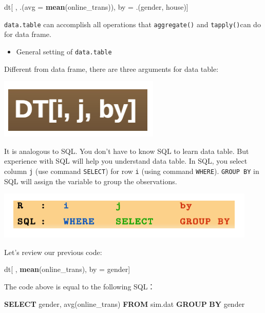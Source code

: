 \documentclass[12pt,]{krantz}
\makeatletter
\newenvironment{Shaded}{\begin{snugshade}}{\end{snugshade}}
\newcommand{\KeywordTok}[1]{\textcolor[rgb]{0.27,0.27,0.27}{\textbf{#1}}}
\newcommand{\DataTypeTok}[1]{\textcolor[rgb]{0.27,0.27,0.27}{#1}}
\newcommand{\StringTok}[1]{\textcolor[rgb]{0.5,0.5,0.5}{#1}}
\newcommand{\FunctionTok}[1]{\textcolor[rgb]{0,0,0}{#1}}
\newcommand{\NormalTok}[1]{#1}
\providecommand{\tightlist}{%
  \setlength{\itemsep}{0pt}\setlength{\parskip}{0pt}}
\newenvironment{kframe}{%
\medskip{}
\setlength{\fboxsep}{.8em}
 \def\at@end@of@kframe{}%
 \ifinner\ifhmode%
  \def\at@end@of@kframe{\end{minipage}}%
  \begin{minipage}{\columnwidth}%
 \fi\fi%
 \def\FrameCommand##1{\hskip\@totalleftmargin \hskip-\fboxsep
 \colorbox{shadecolor}{##1}\hskip-\fboxsep
     \hskip-\linewidth \hskip-\@totalleftmargin \hskip\columnwidth}%
 \MakeFramed {\advance\hsize-\width
   \@totalleftmargin\z@ \linewidth\hsize
   \@setminipage}}%
 {\par\unskip\endMakeFramed%
 \at@end@of@kframe}
\renewenvironment{Shaded}{\begin{kframe}}{\end{kframe}}
\theoremstyle{definition}
\theoremstyle{definition}
\theoremstyle{definition}
\theoremstyle{remark}
\makeatother
\begin{document}
\begin{Shaded}
\begin{Highlighting}[]
\NormalTok{dt[ , .(}\DataTypeTok{avg =} \KeywordTok{mean}\NormalTok{(online_trans)), by =}\StringTok{ }\NormalTok{.(gender, house)]}
\end{Highlighting}
\end{Shaded}

\texttt{data.table} can accomplish all operations that
\texttt{aggregate()} and \texttt{tapply()}can do for data frame.

\begin{itemize}
\tightlist
\item
  General setting of \texttt{data.table}
\end{itemize}

Different from data frame, there are three arguments for data table:

\includegraphics{images/datable1.png}

It is analogous to SQL. You don't have to know SQL to learn data table.
But experience with SQL will help you understand data table. In SQL, you
select column \texttt{j} (use command \texttt{SELECT}) for row
\texttt{i} (using command \texttt{WHERE}). \texttt{GROUP\ BY} in SQL
will assign the variable to group the observations.

\includegraphics{images/rSQL.png}

Let's review our previous code:

\begin{Shaded}
\begin{Highlighting}[]
\NormalTok{dt[ , }\KeywordTok{mean}\NormalTok{(online_trans), by =}\StringTok{ }\NormalTok{gender]}
\end{Highlighting}
\end{Shaded}

The code above is equal to the following SQL：

\begin{Shaded}
\begin{Highlighting}[]
\KeywordTok{SELECT}\NormalTok{  gender, }\FunctionTok{avg}\NormalTok{(online_trans) }\KeywordTok{FROM}\NormalTok{ sim.dat }\KeywordTok{GROUP} \KeywordTok{BY}\NormalTok{ gender}
\end{Highlighting}
\end{Shaded}
\end{document}
